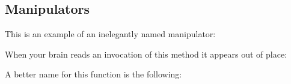 \begin{Shaded}
\begin{Highlighting}[]
\NormalTok{) }\OperatorTok{{-}\textgreater{}} \NormalTok{:}
    \OperatorTok{+}
\end{Highlighting}
\end{Shaded}

\subsection{Manipulators}\label{extra-stuff.md__manipulators}

This is an example of an inelegantly named manipulator:

\begin{Shaded}
\begin{Highlighting}[]
\NormalTok{):}
    \NormalTok{(}
\end{Highlighting}
\end{Shaded}

When your brain reads an invocation of this method it appears out of
place:

\begin{Shaded}
\begin{Highlighting}[]
\OperatorTok{\textgreater{}}
\NormalTok{:}
    \NormalTok{(}\NormalTok{)}
\end{Highlighting}
\end{Shaded}

A better name for this function is the following:

\begin{Shaded}
\begin{Highlighting}[]
\NormalTok{):}
    \NormalTok{(}
\end{Highlighting}
\end{Shaded}

\begin{Shaded}
\begin{Highlighting}[]
\OperatorTok{\textgreater{}}
\NormalTok{:}
    \NormalTok{(}\NormalTok{)}
\end{Highlighting}
\end{Shaded}

